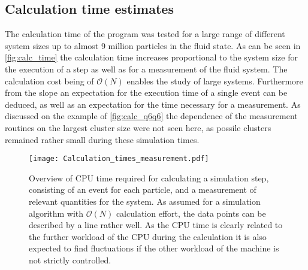 \subsection{Calculation time estimates}
\label{sec:calc_times}
The calculation time of the program was tested for a large range of different system sizes up to almost 9 million particles in the fluid state. As can be seen in \autoref{fig:calc_time} the calculation time increases proportional to the system size for the execution of a step as well as for a measurement of the fluid system. The calculation cost being of $\mathcal{O}(N)$ enables the study of large systems. Furthermore from the slope an expectation for the execution time of a single event can be deduced, as well as an expectation for the time necessary for a measurement. As discussed on the example of \autoref{fig:calc_q6q6} the dependence of the measurement routines on the largest cluster size were not seen here, as possile clusters remained rather small during these simulation times.\\

\begin{figure}[h!]
\centering
\texttt{[image: Calculation\_times\_measurement.pdf]}
\caption{Overview of CPU time required for calculating a simulation step, consisting of an event for each particle, and a measurement of relevant quantities for the system. As assumed for a simulation algorithm with $\mathcal{O}(N)$ calculation effort, the data points can be described by a line rather well. As the CPU time is clearly related to the further workload of the CPU during the calculation it is also expected to find fluctuations if the other workload of the machine is not strictly controlled.}
\label{fig:calc_time}
\end{figure}



